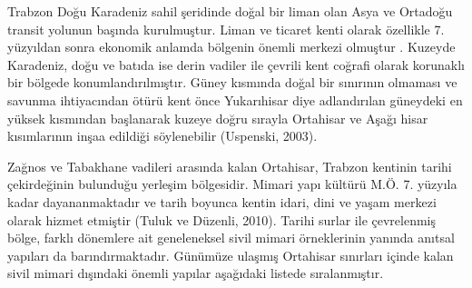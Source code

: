 \documentclass[12pt,turkish,a4paperpaper,]{report}
\begin{document}
Trabzon Doğu Karadeniz sahil şeridinde doğal bir liman olan Asya ve
Ortadoğu transit yolunun başında kurulmuştur. Liman ve ticaret kenti
olarak özellikle 7. yüzyıldan sonra ekonomik anlamda bölgenin önemli
merkezi olmuştur . Kuzeyde Karadeniz, doğu ve batıda ise derin vadiler
ile çevrili kent coğrafi olarak korunaklı bir bölgede
konumlandırılmıştır. Güney kısmında doğal bir sınırının olmaması ve
savunma ihtiyacından ötürü kent önce Yukarıhisar diye adlandırılan
güneydeki en yüksek kısmından başlanarak kuzeye doğru sırayla Ortahisar
ve Aşağı hisar kısımlarının inşaa edildiği söylenebilir (Uspenski,
2003).

Zağnos ve Tabakhane vadileri arasında kalan Ortahisar, Trabzon kentinin
tarihi çekirdeğinin bulunduğu yerleşim bölgesidir. Mimari yapı kültürü
M.Ö. 7. yüzyıla kadar dayananmaktadır ve tarih boyunca kentin idari,
dini ve yaşam merkezi olarak hizmet etmiştir (Tuluk ve Düzenli, 2010).
Tarihi surlar ile çevrelenmiş bölge, farklı dönemlere ait geneleneksel
sivil mimari örneklerinin yanında anıtsal yapıları da barındırmaktadır.
Günümüze ulaşmış Ortahisar sınırları içinde kalan sivil mimari dışındaki
önemli yapılar aşağıdaki listede sıralanmıştır.
\end{document}
